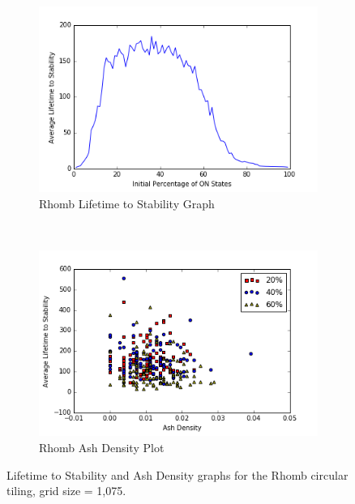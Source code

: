 \documentclass[a4paper,11pt,twoside]{report}
\begin{document}
\begin{figure}[htp]
\centering
\begin{subfigure}[t]{0.6\textwidth}
	\centering
	\includegraphics[width=\textwidth]{ch4_figs/crh_lifetime}
	\caption{Rhomb Lifetime to Stability Graph}
\end{subfigure}
~
\begin{subfigure}[t]{0.6\textwidth}
	\centering
	\includegraphics[width=\textwidth]{ch4_figs/crh_ash_density}
	\caption{Rhomb Ash Density Plot}
\end{subfigure}

\caption[Rhomb Lifetime and Ash Density Graphs]{
	Lifetime to Stability and Ash Density graphs for the Rhomb circular tiling, grid size = 1,075. 
}
\label{fig:crh_lifetime_density}
\end{figure}
\end{document}
